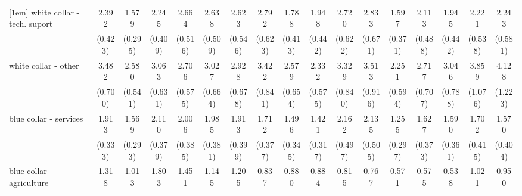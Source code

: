 {\begin{tabular}{l*{16}{c}}
[1em]
white collar - tech. suport&       2.392\sym{***}&       1.579\sym{*}  &       2.245\sym{***}&       2.664\sym{***}&       2.638\sym{***}&       2.623\sym{***}&       2.792\sym{***}&       1.788\sym{*}  &       1.948\sym{**} &       2.720\sym{***}&       2.833\sym{***}&       1.597\sym{*}  &       2.113\sym{**} &       1.945\sym{**} &       2.221\sym{***}&       2.243\sym{**} \\
                    &     (0.423)         &     (0.295)         &     (0.409)         &     (0.516)         &     (0.509)         &     (0.546)         &     (0.623)         &     (0.413)         &     (0.442)         &     (0.622)         &     (0.671)         &     (0.371)         &     (0.488)         &     (0.442)         &     (0.538)         &     (0.581)         \\
[1em]
white collar - other&       3.482\sym{***}&       2.580\sym{***}&       3.063\sym{***}&       2.706\sym{***}&       3.027\sym{***}&       2.928\sym{***}&       3.422\sym{***}&       2.579\sym{***}&       2.332\sym{***}&       3.329\sym{***}&       3.513\sym{***}&       2.251\sym{**} &       2.717\sym{***}&       3.046\sym{***}&       3.859\sym{***}&       4.128\sym{***}\\
                    &     (0.700)         &     (0.541)         &     (0.631)         &     (0.575)         &     (0.664)         &     (0.678)         &     (0.841)         &     (0.654)         &     (0.575)         &     (0.840)         &     (0.916)         &     (0.594)         &     (0.707)         &     (0.788)         &     (1.076)         &     (1.223)         \\
[1em]
blue collar - services&       1.913\sym{***}&       1.569\sym{*}  &       2.110\sym{***}&       2.006\sym{***}&       1.985\sym{***}&       1.913\sym{**} &       1.712\sym{*}  &       1.496         &       1.421         &       2.162\sym{***}&       2.135\sym{**} &       1.255         &       1.627\sym{*}  &       1.590\sym{*}  &       1.702\sym{*}  &       1.570         \\
                    &     (0.333)         &     (0.293)         &     (0.379)         &     (0.385)         &     (0.381)         &     (0.399)         &     (0.377)         &     (0.345)         &     (0.317)         &     (0.497)         &     (0.505)         &     (0.297)         &     (0.373)         &     (0.361)         &     (0.415)         &     (0.404)         \\
[1em]
blue collar - agriculture&       1.318         &       1.013         &       1.803\sym{*}  &       1.451         &       1.145         &       1.205         &       0.837         &       0.880         &       0.884         &       0.815         &       0.767         &       0.571         &       0.575         &       0.538         &       1.021         &       0.950         \\

\end{tabular}}
